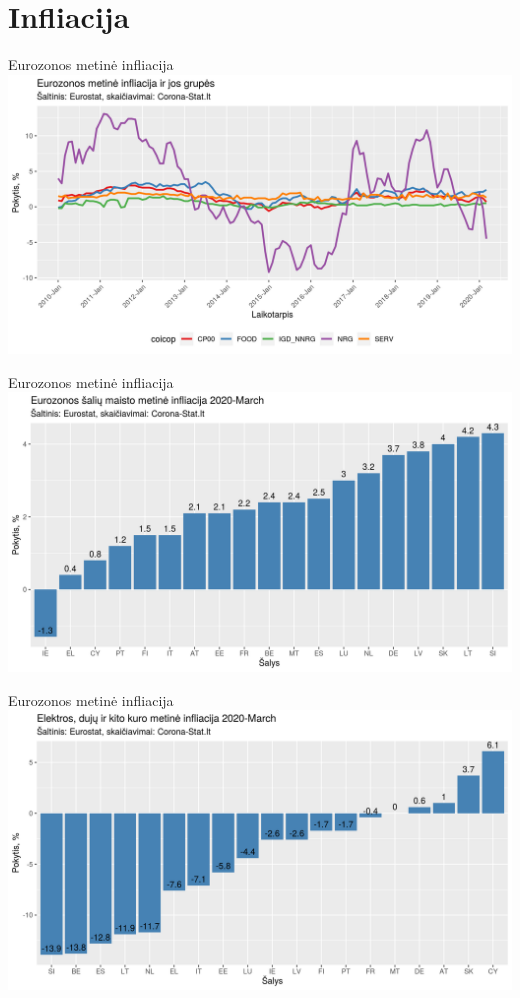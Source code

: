\documentclass[11pt]{beamer}
\begin{document}
\section{Infliacija}
\begin{frame}{Eurozonos metinė infliacija}
\includegraphics[scale=0.5]{infliacija_ez.png}
\end{frame}

\begin{frame}{Eurozonos metinė infliacija}
\includegraphics[scale=0.5]{infliacija_maistas.png}
\end{frame}

\begin{frame}{Eurozonos metinė infliacija}
\includegraphics[scale=0.5]{infliacija_elektra_dujos.png}
\end{frame}
\end{document}
